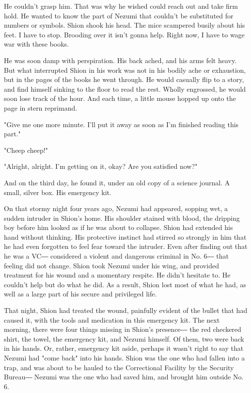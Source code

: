 He couldn't grasp him. That was why he wished could reach out and take
firm hold. He wanted to know the part of Nezumi that couldn't be
substituted for numbers or symbols. Shion shook his head. The mice
scampered busily about his feet. I have to stop. Brooding over it isn't
gonna help. Right now, I have to wage war with these books.

He was soon damp with perspiration. His back ached, and his arms felt
heavy. But what interrupted Shion in his work was not in his bodily ache
or exhaustion, but in the pages of the books he went through. He would
casually flip to a story, and find himself sinking to the floor to read
the rest. Wholly engrossed, he would soon lose track of the hour. And
each time, a little mouse hopped up onto the page in stern reprimand.

"Give me one more minute. I'll put it away as soon as I'm finished
reading this part."

"Cheep cheep!"

"Alright, alright. I'm getting on it, okay? Are you satisfied now?"

And on the third day, he found it, under an old copy of a science
journal. A small, silver box. His emergency kit.

On that stormy night four years ago, Nezumi had appeared, sopping wet, a
sudden intruder in Shion's home. His shoulder stained with blood, the
dripping boy before him looked as if he was about to collapse. Shion had
extended his hand without thinking. His protective instinct had stirred
so strongly in him that he had even forgotten to feel fear toward the
intruder. Even after finding out that he was a VC― considered a violent
and dangerous criminal in No. 6― that feeling did not change. Shion took
Nezumi under his wing, and provided treatment for his wound and a
momentary respite. He didn't hesitate to. He couldn't help but do what
he did. As a result, Shion lost most of what he had, as well as a large
part of his secure and privileged life.

That night, Shion had treated the wound, painfully evident of the bullet
that had caused it, with the tools and medication in this emergency kit.
The next morning, there were four things missing in Shion's presence―
the red checkered shirt, the towel, the emergency kit, and Nezumi
himself. Of them, two were back in his hands. Or, rather, emergency kit
aside, perhaps it wasn't right to say that Nezumi had "come back" into
his hands. Shion was the one who had fallen into a trap, and was about
to be hauled to the Correctional Facility by the Security Bureau― Nezumi
was the one who had saved him, and brought him outside No. 6.

